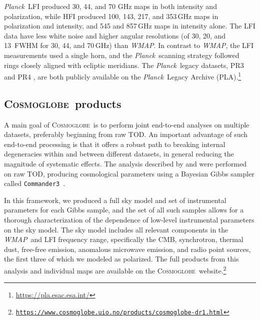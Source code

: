 \documentclass[twocolumn]{../../common/aa}
\def\WMAP{\emph{WMAP}}
\def\Planck{\emph{Planck}}
\def\commanderthree{\texttt{Commander3}}
\newcommand{\cosmoglobe}{\textsc{Cosmoglobe}}
\newcommand{\Cosmoglobe}{\textsc{Cosmoglobe}}
\begin{document}
\Planck\ LFI produced  30, 44, and 70 GHz maps in both intensity and polarization, while  HFI  produced 100, 143, 217, and 353\,GHz maps in polarization and intensity, and 545 and 857\,GHz maps in intensity alone. The LFI data have less white noise and higher angular resolutions (of 30\arcm, 20\arcm, and 13\arcm\ FWHM for 30, 44, and 70\,GHz) than \WMAP. In contrast to \WMAP, the LFI measurements used a single horn, and the \Planck\ scanning strategy followed rings closely aligned with ecliptic meridians. The \Planck\ legacy datasets, PR3 \citep{planck2016-l01} and PR4 \citep{planck2020-LVII}, are both publicly available on the \Planck\ Legacy Archive (PLA).\footnote{\url{https://pla.esac.esa.int/}}

\subsection{\Cosmoglobe\ products}
\label{sec:cosmoglobe_data}


A main goal of \Cosmoglobe\ is to perform joint end-to-end analyses on multiple datasets, preferably beginning from raw TOD. An important advantage of such end-to-end processing is that it offers a robust path to breaking internal degeneracies within and between different datasets, in general reducing the magnitude of systematic effects. The analysis described by \citet{bp01} and \citet{watts2023_dr1} were performed on raw TOD, producing cosmological parameters using a Bayesian Gibbs sampler called \commanderthree\ \citep{bp03}. %

In this framework, we produced a full sky model and set of instrumental parameters for each Gibbs sample, and the set of all such samples allows for a thorough characterization of the dependence of low-level instrumental parameters on the sky model. The sky model includes all relevant components in the \WMAP\ and LFI frequency range, specifically the CMB, synchrotron, thermal dust, free-free emission, anomalous microwave emission, and radio point sources, the first three of which we modeled as polarized. The full products from this analysis and individual maps are available on the \cosmoglobe\ website.\footnote{\href{https://www.cosmoglobe.uio.no/products/cosmoglobe-dr1.html}{\texttt{https://www.cosmoglobe.uio.no/products/\newline cosmoglobe-dr1.html}}}
\end{document}
